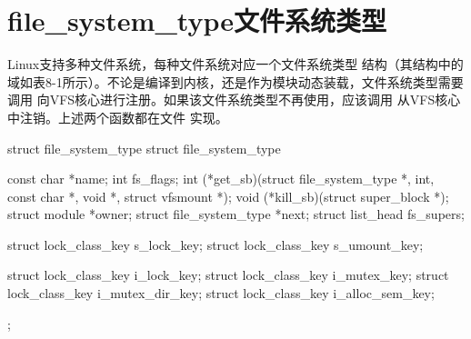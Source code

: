 \section{file\_system\_type文件系统类型}

Linux支持多种文件系统，每种文件系统对应一个文件系统类型  结构（其结构中的域如表8-1所示）。不论是编译到内核，还是作为模块动态装载，文件系统类型需要调用  向VFS核心进行注册。如果该文件系统类型不再使用，应该调用  从VFS核心中注销。上述两个函数都在文件  实现。

\begin{mylangC}{struct file\_system\_type}
	struct file_system_type {
	const char *name;
	int fs_flags;
	int (*get_sb)(struct file_system_type *, int, const char *, void *, struct vfsmount *);
	void (*kill_sb)(struct super_block *);
	struct module *owner;
	struct file_system_type *next;
	struct list_head fs_supers;

	struct lock_class_key s_lock_key;
	struct lock_class_key s_umount_key;

	struct lock_class_key i_lock_key;
	struct lock_class_key i_mutex_key;
	struct lock_class_key i_mutex_dir_key;
	struct lock_class_key i_alloc_sem_key;
	};
\end{mylangC}
